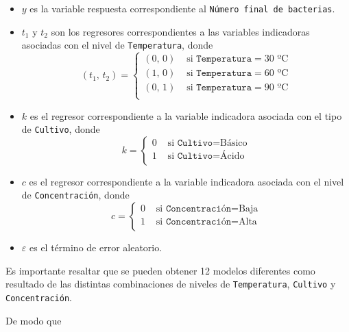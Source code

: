 \documentclass[10pt, spanish]{article}
\begin{document}
\begin{itemize}
\item
  \(y\) es la variable respuesta correspondiente al
  \texttt{Número\ final\ de\ bacterias}.
\item
  \(t_1\) y \(t_2\) son los regresores correspondientes a las variables
  indicadoras asociadas con el nivel de \texttt{Temperatura}, donde \[
  (t_1,\,t_2) =
  \begin{cases}
  (0,\,0) & \text{ si } \texttt{Temperatura} = 30 \text{ ºC} \\
  (1,\,0) & \text{ si } \texttt{Temperatura} = 60 \text{ ºC} \\
  (0,\,1) & \text{ si } \texttt{Temperatura} = 90 \text{ ºC} \\
  \end{cases}
  \]
\item
  \(k\) es el regresor correspondiente a la variable indicadora asociada
  con el tipo de \texttt{Cultivo}, donde \[
  k =
  \begin{cases}
  0 & \text{ si } \texttt{Cultivo} = \text{Básico} \\
  1 & \text{ si } \texttt{Cultivo} = \text{Ácido} \\
  \end{cases}
  \]
\item
  \(c\) es el regresor correspondiente a la variable indicadora asociada
  con el nivel de \texttt{Concentración}, donde \[
  c =
  \begin{cases}
  0 & \text{ si } \texttt{Concentración} = \text{Baja} \\
  1 & \text{ si } \texttt{Concentración} = \text{Alta} \\
  \end{cases}
  \]
\item
  \(\varepsilon\) es el término de error aleatorio.
\end{itemize}

    Es importante resaltar que se pueden obtener 12 modelos diferentes como
resultado de las distintas combinaciones de niveles de
\texttt{Temperatura}, \texttt{Cultivo} y \texttt{Concentración}.

    De modo que
\end{document}

